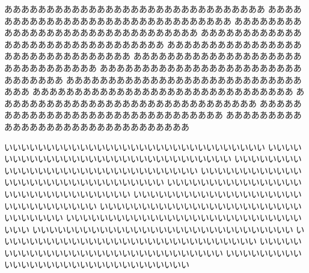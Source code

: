 \begin{breakLline}[fboxsep=10pt]
%
あああああああああああああああああああああああああああああああ
あああああああああああああああああああああああああああああああ
あああああああああああああああああああああああああああああああ
あああああああああああああああああああああああああああああああ
あああああああああああああああああああああああああああああああ
あああああああああああああああああああああああああああああああ
あああああああああああああああああああああああああああああああ
あああああああああああああああああああああああああああああああ
あああああああああああああああああああああああああああああああ
あああああああああああああああああああああああああああああああ
あああああああああああああああああああああああああああああああ
あああああああああああああああああああああああああああああああ

いいいいいいいいいいいいいいいいいいいいいいいいいいいいいいい
いいいいいいいいいいいいいいいいいいいいいいいいいいいいいいい
いいいいいいいいいいいいいいいいいいいいいいいいいいいいいいい
いいいいいいいいいいいいいいいいいいいいいいいいいいいいいいい
いいいいいいいいいいいいいいいいいいいいいいいいいいいいいいい
いいいいいいいいいいいいいいいいいいいいいいいいいいいいいいい
いいいいいいいいいいいいいいいいいいいいいいいいいいいいいいい
いいいいいいいいいいいいいいいいいいいいいいいいいいいいいいい
いいいいいいいいいいいいいいいいいいいいいいいいいいいいいいい
いいいいいいいいいいいいいいいいいいいいいいいいいいいいいいい
いいいいいいいいいいいいいいいいいいいいいいいいいいいいいいい
いいいいいいいいいいいいいいいいいいいいいいいいいいいいいいい


\end{breakLline}
